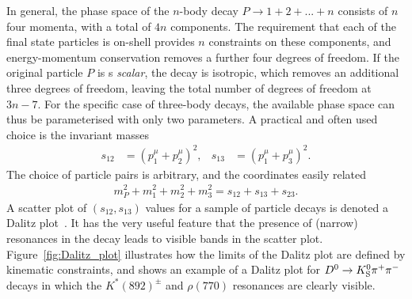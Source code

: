 In general, the phase space of the $n$-body decay $P\to 1 + 2 + ... + n$ consists of $n$ four momenta, with a total of $4n$ components. The requirement that each of the final state particles is on-shell provides $n$ constraints on these components, and energy-momentum conservation removes a further four degrees of freedom. If the original particle $P$ is s \emph{scalar}, the decay is isotropic, which removes an additional three degrees of freedom, leaving the total number of degrees of freedom at $3n-7$. For the specific case of three-body decays, the available phase space can thus be parameterised with only two parameters. A practical and often used choice is the invariant masses
\begin{align}\label{eq:dalitz_coords}
    s_{12} &= (p_1^\mu+p_2^\mu)^2, & s_{13} &= (p_1^\mu+p_3^\mu)^2.
\end{align}
The choice of particle pairs is arbitrary, and the coordinates easily related
\begin{align}
    m^2_P + m^2_{1} + m^2_{2} + m^2_{3} = s_{12} + s_{13} + s_{23}.
\end{align}
A scatter plot of $(s_{12}, s_{13})$ values for a sample of particle decays is denoted a Dalitz plot~\cite{dalitzCXIIAnalysisTmeson1953}. It has the very useful feature that the presence of (narrow) resonances in the decay leads to visible bands in the scatter plot. Figure~\ref{fig:Dalitz_plot} illustrates how the limits of the Dalitz plot are defined by kinematic constraints, and shows an example of a Dalitz plot for ${{D}^0}\rightarrow{\ensuremath{{K}^0_{\mathrm{S}}}}{\ensuremath{{\pi}^+}}{\ensuremath{{\pi}^-}}$ decays in which the $K^*(892)^\pm$ and $\rho(770)$ resonances are clearly visible. 


